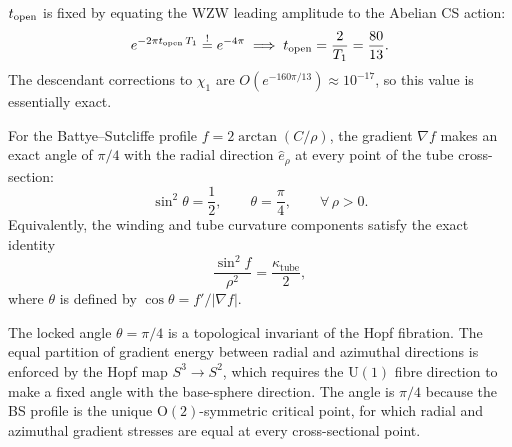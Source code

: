\begin{definition}
\label{P4:def:t_open}
$t_{\rm open}$ is fixed by equating the WZW leading amplitude to the
Abelian CS action:
\begin{equation}
  e^{-2\pi t_{\rm open}\,T_1} \stackrel{!}{=} e^{-4\pi}
  \;\Longrightarrow\;
  t_{\rm open} = \frac{2}{T_1} = \frac{80}{13}.
  \label{P4:eq:t_open_val}
\end{equation}
The descendant corrections to $\chi_1$ are $O(e^{-160\pi/13})\approx10^{-17}$,
so this value is essentially exact.
\end{definition}

\begin{lemma}
\label{P4:lem:locked_angle}
For the Battye--Sutcliffe profile $f = 2\arctan(C/\rho)$, the gradient $\nabla f$
makes an exact angle of $\pi/4$ with the radial direction $\hat{e}_\rho$
at every point of the tube cross-section:
\begin{equation}
  \sin^2\!\theta = \frac{1}{2},
  \qquad \theta = \frac{\pi}{4}, \qquad \forall\,\rho > 0.
  \label{P4:eq:locked_angle}
\end{equation}
Equivalently, the winding and tube curvature components satisfy the exact identity
\begin{equation}
  \frac{\sin^2\!f}{\rho^2} = \frac{\kappa_\mathrm{tube}}{2},
  \label{P4:eq:kappa_identity}
\end{equation}
where $\theta$ is defined by $\cos\theta = f'/|\nabla f|$.
\end{lemma}

\begin{remark}
\label{P4:rem:theta_topological_origin}
The locked angle $\theta = \pi/4$ is a topological invariant of the Hopf
fibration.  The equal partition of gradient energy between radial and
azimuthal directions is enforced by the Hopf map $S^3\to S^2$, which
requires the $\mathrm{U}(1)$ fibre direction to make a fixed angle with
the base-sphere direction.  The angle is $\pi/4$ because the BS profile
is the unique $\mathrm{O}(2)$-symmetric critical point, for which radial
and azimuthal gradient stresses are equal at every cross-sectional point.
\end{remark}


